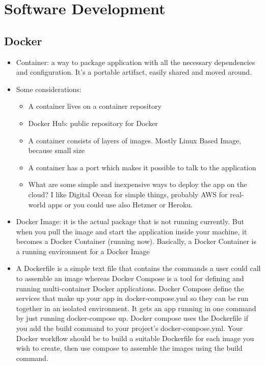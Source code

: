 
\chapter{Software Development} %

\label{ChapterX} %


\section{Docker}
\begin{itemize}
    \item Container: a way to package application with all the necessary dependencies and configuration. It's a portable artifact, easily shared and moved around.
    \item Some considerations:
        \begin{itemize}
            \item A container lives on a container repository
            \item Docker Hub: public repository for Docker
            \item A container consists of layers of images. Mostly Linux Based Image, because small size
            \item A container has a port which makes it possible to talk to the application
            \item What are some simple and inexpensive ways to deploy the app on the cloud? I like Digital Ocean for simple things, probably AWS for real-world apps or you could use also Hetzner or Heroku.
        \end{itemize}
    
    \item Docker Image: it is the actual package that is not running currently. But when you pull the image and start the application inside your machine, it becomes a Docker Container (running now). Basically, a Docker Container is a running environment for a Docker Image

    \item A Dockerfile is a simple text file that contains the commands a user could call to assemble an image whereas Docker Compose is a tool for defining and running multi-container Docker applications.
    Docker Compose define the services that make up your app in docker-compose.yml so they can be run together in an isolated environment. It gets an app running in one command by just running docker-compose up. Docker compose uses the Dockerfile if you add the build command to your project’s docker-compose.yml. Your Docker workflow should be to build a suitable Dockerfile for each image you wish to create, then use compose to assemble the images using the build command.

    \end{itemize}

